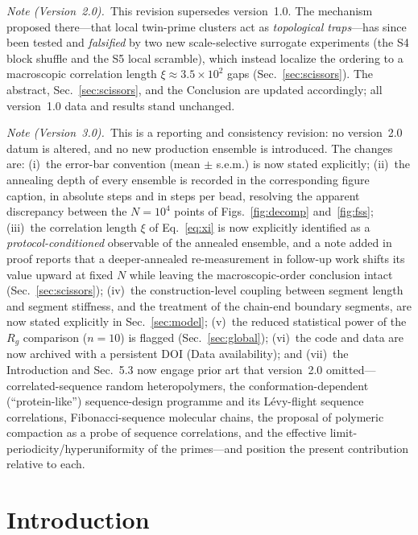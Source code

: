 \documentclass[11pt]{article}
\begin{document}
\noindent\emph{Note (Version~2.0).}~This revision supersedes version~1.0. The
mechanism proposed there---that local twin-prime clusters act as \emph{topological
traps}---has since been tested and \emph{falsified} by two new scale-selective
surrogate experiments (the S4 block shuffle and the S5 local scramble), which
instead localize the ordering to a macroscopic correlation length
$\xi \approx 3.5\times10^{2}$ gaps (Sec.~\ref{sec:scissors}). The abstract,
Sec.~\ref{sec:scissors}, and the Conclusion are updated accordingly; all
version~1.0 data and results stand unchanged.

\medskip
\noindent\emph{Note (Version~3.0).}~This is a reporting and consistency revision:
no version~2.0 datum is altered, and no new production ensemble is introduced.
The changes are: (i)~the error-bar convention (mean $\pm$ s.e.m.) is now stated
explicitly; (ii)~the annealing depth of every ensemble is recorded in the
corresponding figure caption, in absolute steps and in steps per bead, resolving
the apparent discrepancy between the $N=10^{4}$ points of
Figs.~\ref{fig:decomp} and~\ref{fig:fss}; (iii)~the correlation length $\xi$ of
Eq.~\eqref{eq:xi} is now explicitly identified as a \emph{protocol-conditioned}
observable of the annealed ensemble, and a note added in proof reports that a
deeper-annealed re-measurement in follow-up work shifts its value upward at fixed
$N$ while leaving the macroscopic-order conclusion intact
(Sec.~\ref{sec:scissors}); (iv)~the construction-level coupling between segment
length and segment stiffness, and the treatment of the chain-end boundary
segments, are now stated explicitly in Sec.~\ref{sec:model}; (v)~the reduced
statistical power of the $R_g$ comparison ($n=10$) is flagged
(Sec.~\ref{sec:global}); (vi)~the code and data are now archived with a
persistent DOI (Data availability); and (vii)~the Introduction and Sec.~5.3 now
engage prior art that version~2.0 omitted---correlated-sequence random
heteropolymers, the conformation-dependent (``protein-like'') sequence-design
programme and its L\'evy-flight sequence correlations, Fibonacci-sequence molecular
chains, the proposal of polymeric compaction as a probe of sequence correlations,
and the effective limit-periodicity/hyperuniformity of the primes---and position
the present contribution relative to each.

\section{Introduction}
\end{document}
